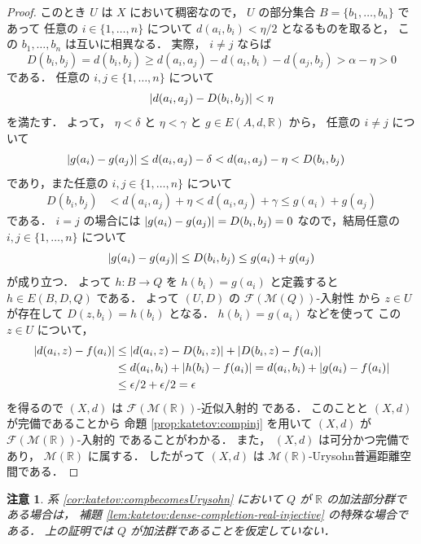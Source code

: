\documentclass[leqno, 12pt]{jsarticle}
\newtheorem*{rmk}{注意}
\newcommand{\rr}{\mathbb{R}}
\DeclarePairedDelimiter{\abs}{\lvert}{\rvert}
\newcommand{\Met}[1]{\mathscr{M}(#1)}
\newcommand{\FinitePart}[1]{\mathscr{F}(#1)}
\newcommand{\FinMet}[1]{\FinitePart{\Met{#1}}}
\newcommand{\Espace}[3]{E(#1,#2,#3)}
\begin{document}
\begin{proof}
このとき
$U$
は
$X$
において稠密なので，
$U$
の部分集合
$B=\{b_{1}, \dots, b_{n}\}$
であって
任意の
$i\in \{1, \dots, n\}$
について
$d(a_{i}, b_{i})< \eta/2$
となるものを取ると，
この
$b_1,\dots,b_n$
は互いに相異なる．
実際，
$i\neq j$
ならば
\[
D(b_i,b_j)=d(b_i,b_j)
\ge d(a_i,a_j)-d(a_i,b_i)-d(a_j,b_j)
>\alpha-\eta
>0
\]
である．
任意の
$i, j\in \{1, \dots, n\}$%
について
\[
\abs{d(a_{i}, a_{j})-D(b_{i}, b_{j})}< \eta
\]
を満たす．
よって，
$\eta< \delta$%
と%
$\eta< \gamma$
と
$g\in \Espace{A}{d}{\rr}$%
から，
任意の
$i\neq j$
について
\begin{align*}
\abs{g(a_i)-g(a_j)}
&\le d(a_{i}, a_{j})-\delta<d(a_{i}, a_{j})-\eta<D(b_{i},b_{j})
\end{align*}
であり，また任意の
$i,j\in\{1,\dots,n\}$
について
\begin{align*}
D(b_{i}, b_{j})
&<d(a_{i}, a_{j})+\eta<d(a_{i}, a_{j})+\gamma\le g(a_{i})+g(a_{j})
\end{align*}
である．
$i=j$
の場合には
$\abs{g(a_{i})-g(a_{j})}=D(b_{i}, b_{j})=0$
なので，結局任意の
$i,j\in\{1,\dots,n\}$
について
\[
\abs{g(a_{i})-g(a_{j})}\le D(b_{i}, b_{j})\le g(a_{i})+g(a_{j})
\]
が成り立つ．
よって
$h\colon  B\to Q$
を
$h(b_i)=g(a_i)$
と定義すると
$h\in \Espace{B}{D}{Q}$
である．
よって
$(U, D)$
の
$\FinMet{Q}$-入射性
から
$z\in U$%
が存在して
$D(z, b_{i})=h(b_{i})$
となる．
$h(b_{i})=g(a_{i})$
などを使って
この
$z\in U$
について，
\begin{align*}
\abs{d(a_{i}, z)-f(a_{i})}&\le \abs{d(a_{i}, z)-D(b_{i}, z)}+\abs{D(b_{i}, z)-f(a_{i})}\\
&\le d(a_{i}, b_{i})+\abs{h(b_{i})-f(a_{i})}= d(a_i, b_{i})+\abs{g(a_{i})-f(a_{i})}\\
&\le \epsilon/2+\epsilon/2=\epsilon
\end{align*}
を得るので
$(X, d)$
は
$\FinMet{\rr}$-近似入射的
である．
このことと
$(X, d)$
が完備であることから
命題
\ref{prop:katetov:compinj}
を用いて
$(X, d)$
が
$\FinMet{\rr}$-入射的
であることがわかる．
また，
$(X,d)$
は可分かつ完備であり，
$\Met{\rr}$
に属する．
したがって
$(X,d)$
は
$\Met{\rr}$-Urysohn普遍距離空間である．
\end{proof}
\begin{rmk}\label{rmk:katetov:completion-corollary}
系
\ref{cor:katetov:compbecomesUrysohn}
において
$Q$
が
$\rr$
の加法部分群である場合は，
補題
\ref{lem:katetov:dense-completion-real-injective}
の特殊な場合である．
上の証明では
$Q$
が加法群であることを仮定していない．
\end{rmk}
\end{document}
